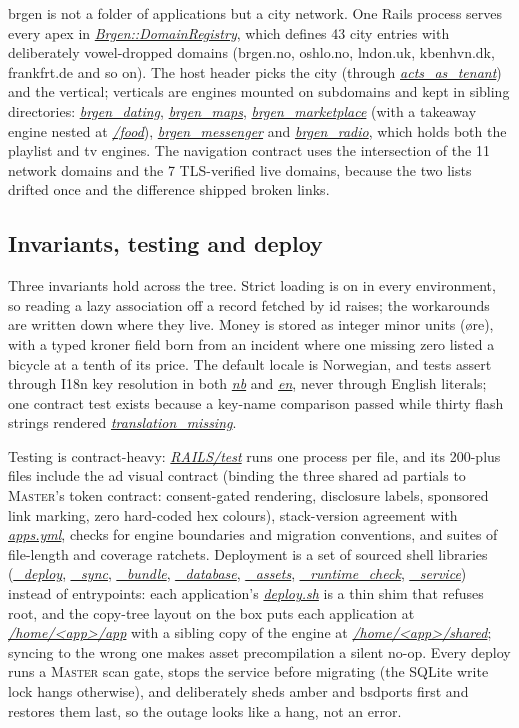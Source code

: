 \documentclass[oneside]{article}
\newcommand{\treename}[1]{\mbox{\textsc{#1}}}
\newcommand{\mtree}{\treename{Master}}
\newcommand{\fpath}[1]{\emph{\url{#1}}}
\begin{document}
brgen is not a folder of applications but a city network. One Rails process serves every apex in \fpath{Brgen::DomainRegistry}, which defines 43 city entries with deliberately vowel-dropped domains (brgen.no, oshlo.no, lndon.uk, kbenhvn.dk, frankfrt.de and so on). The host header picks the city (through \fpath{acts_as_tenant}) and the vertical; verticals are engines mounted on subdomains and kept in sibling directories: \fpath{brgen_dating}, \fpath{brgen_maps}, \fpath{brgen_marketplace} (with a takeaway engine nested at \fpath{/food}), \fpath{brgen_messenger} and \fpath{brgen_radio}, which holds both the playlist and tv engines. The navigation contract uses the intersection of the 11 network domains and the 7 TLS-verified live domains, because the two lists drifted once and the difference shipped broken links.

\subsection{Invariants, testing and deploy}

Three invariants hold across the tree. Strict loading is on in every environment, so reading a lazy association off a record fetched by id raises; the workarounds are written down where they live. Money is stored as integer minor units (\o{}re), with a typed kroner field born from an incident where one missing zero listed a bicycle at a tenth of its price. The default locale is Norwegian, and tests assert through I18n key resolution in both \fpath{nb} and \fpath{en}, never through English literals; one contract test exists because a key-name comparison passed while thirty flash strings rendered \fpath{translation_missing}.

Testing is contract-heavy: \fpath{RAILS/test} runs one process per file, and its 200-plus files include the ad visual contract (binding the three shared ad partials to \mtree's token contract: consent-gated rendering, disclosure labels, sponsored link marking, zero hard-coded hex colours), stack-version agreement with \fpath{apps.yml}, checks for engine boundaries and migration conventions, and suites of file-length and coverage ratchets. Deployment is a set of sourced shell libraries (\fpath{_deploy}, \fpath{_sync}, \fpath{_bundle}, \fpath{_database}, \fpath{_assets}, \fpath{_runtime_check}, \fpath{_service}) instead of entrypoints: each application's \fpath{deploy.sh} is a thin shim that refuses root, and the copy-tree layout on the box puts each application at \fpath{/home/<app>/app} with a sibling copy of the engine at \fpath{/home/<app>/shared}; syncing to the wrong one makes asset precompilation a silent no-op. Every deploy runs a \mtree{} scan gate, stops the service before migrating (the SQLite write lock hangs otherwise), and deliberately sheds amber and bsdports first and restores them last, so the outage looks like a hang, not an error.
\end{document}
